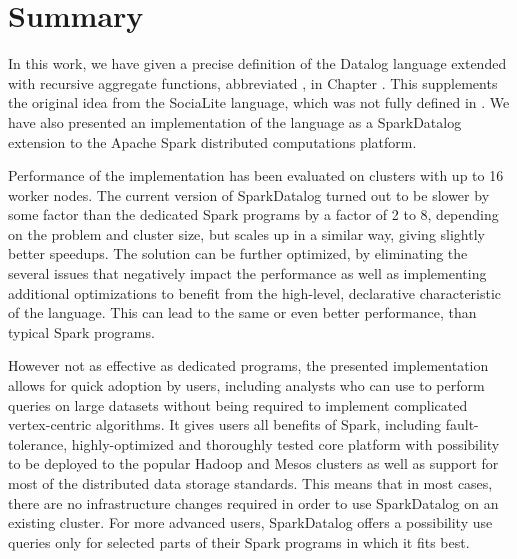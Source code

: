 

\chapter{Summary}\label{r:summary}



In this work, we have given a precise definition of the Datalog language extended with recursive aggregate functions, abbreviated \datalogra, in Chapter \label{r:socialite}. This supplements the original idea from the SociaLite language, which was not fully defined in \cite{socialite, distsoc}. We have also presented an implementation of the \datalogra language as a SparkDatalog extension to the Apache Spark distributed computations platform.

Performance of the implementation has been evaluated on clusters with up to 16 worker nodes. The current version of SparkDatalog turned out to be slower by some factor than the dedicated Spark programs by a factor of 2 to 8, depending on the problem and cluster size, but scales up in a similar way, giving slightly better speedups. The solution can be further optimized, by eliminating the several issues that negatively impact the performance as well as implementing additional optimizations to benefit from the high-level, declarative characteristic of the language. This can lead to the same or even better performance, than typical Spark programs.

However not as effective as dedicated programs, the presented implementation allows for quick adoption by users, including analysts who can use \datalogra to perform queries on large datasets without being required to implement complicated vertex-centric algorithms. It gives users all benefits of Spark, including fault-tolerance, highly-optimized and thoroughly tested core platform with possibility to be deployed to the popular Hadoop and Mesos clusters as well as support for most of the distributed data storage standards. This means that in most cases, there are no infrastructure changes required in order to use SparkDatalog on an existing cluster. For more advanced users, SparkDatalog offers a possibility use \datalogra queries only for selected parts of their Spark programs in which it fits best.


